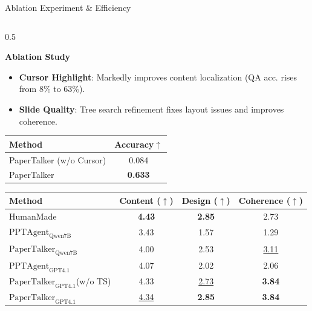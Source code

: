 \documentclass{beamer}
\newcommand{\alertterm}[1]{\alert{\textbf{#1}}}
\begin{document}
\begin{frame}{Ablation Experiment \& Efficiency}
\begin{columns}[T]
    \begin{column}{0.5\textwidth}
      \begin{block}{\small \alertterm{Ablation Study}}
        \small
        \begin{itemize}
          \item \textbf{Cursor Highlight}: Markedly improves content localization (QA acc. rises from 8\% to 63\%).
          \item \textbf{Slide Quality}: Tree search refinement fixes layout issues and improves coherence.
        \end{itemize}
      \end{block}
      \vspace{-0.5\baselineskip}
      \centering
      \tiny
      \label{table:cursor_exp}
      \begin{tabular}{lc}
        \toprule
        Method & Accuracy$\uparrow$ \\
        \midrule
        PaperTalker (w/o Cursor) & 0.084 \\
        PaperTalker & \textbf{0.633} \\
        \bottomrule
      \end{tabular}
      \vspace{0.5\baselineskip}
      \label{tab:slide_quality_exp}
      \begin{tabular}{lccc}
        \toprule
        Method & Content ($\uparrow$) & Design ($\uparrow$) & Coherence ($\uparrow$) \\
        \midrule
        HumanMade & \textbf{4.43} & \textbf{2.85} & 2.73 \\
        \midrule
        $\text{PPTAgent}_\text{Qwen7B}$~\cite{zheng2025pptagent} & 3.43 & 1.57 & 1.29 \\
        $\text{PaperTalker}_\text{Qwen7B}$ & 4.00 & 2.53 & \underline{3.11} \\
        \midrule
        $\text{PPTAgent}_\text{GPT4.1}$~\cite{zheng2025pptagent} & 4.07 & 2.02 & 2.06 \\
        $\text{PaperTalker}_\text{GPT4.1}$(w/o TS) & 4.33 & \underline{2.73} & \textbf{3.84} \\
        $\text{PaperTalker}_\text{GPT4.1}$ & \underline{4.34} & \textbf{2.85} & \textbf{3.84} \\
        \bottomrule
      \end{tabular}
    \end{column}
  \end{columns}
\end{frame}
\end{document}
